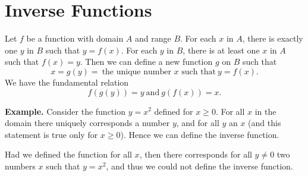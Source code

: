 \chapter*{Inverse Functions}
Let $f$ be a function with domain $A$ and range $B$. For each $x$ in $A$, there is exactly one $y$ in $B$ such that $y = f(x)$. For each $y$ in $B$, there is at least one $x$ in $A$ such that $f(x) = y$. Then we can define a new function $g$ on $B$ such that
\[x = g(y) =\: \text{the unique number $x$ such that}\: y = f(x).\]
We have the fundamental relation
\[f(g(y)) = y\: \text{and}\: g(f(x)) = x.\]

\textbf{Example.} Consider the function $y = x^2$ defined for $x \ge 0$. For all $x$ in the domain there uniquely corresponds a number $y$, and for all $y$ an $x$ (and this statement is true only for $x \ge 0$). Hence we can define the inverse function.

Had we defined the function for all $x$, then there corresponds for all $y \ne 0$ two numbers $x$ such that $y = x^2$, and thus we could not define the inverse function.

